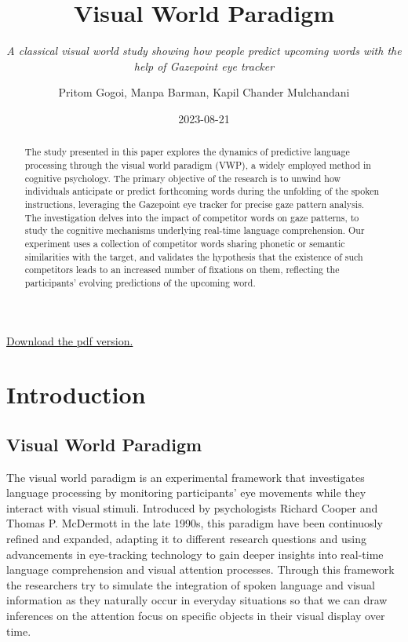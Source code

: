 \documentclass[
  a4paper,
]{article}
\title{\textbf{Visual World Paradigm}}
\subtitle{\emph{A classical visual world study showing how people
predict upcoming words with the help of Gazepoint eye tracker}}
\author{Pritom Gogoi, Manpa Barman, Kapil Chander Mulchandani}
\date{2023-08-21}
\renewcommand*\contentsname{Table of contents}
\newcommand\contentsname{Table of contents}
\begin{document}
\maketitle
\begin{abstract}
The study presented in this paper explores the dynamics of predictive
language processing through the visual world paradigm (VWP), a widely
employed method in cognitive psychology. The primary objective of the
research is to unwind how individuals anticipate or predict forthcoming
words during the unfolding of the spoken instructions, leveraging the
Gazepoint eye tracker for precise gaze pattern analysis. The
investigation delves into the impact of competitor words on gaze
patterns, to study the cognitive mechanisms underlying real-time
language comprehension. Our experiment uses a collection of competitor
words sharing phonetic or semantic similarities with the target, and
validates the hypothesis that the existence of such competitors leads to
an increased number of fixations on them, reflecting the participants'
evolving predictions of the upcoming word.
\end{abstract}
\ifdefined\Shaded\renewenvironment{Shaded}{\begin{tcolorbox}[borderline west={3pt}{0pt}{shadecolor}, enhanced, breakable, boxrule=0pt, interior hidden, frame hidden, sharp corners]}{\end{tcolorbox}}\fi

\renewcommand*\contentsname{Table of contents}
{
\hypersetup{linkcolor=}
\setcounter{tocdepth}{3}
\tableofcontents
}
\href{report/docs/report.pdf}{Download the pdf version.}

\hypertarget{introduction}{%
\section{Introduction}\label{introduction}}

\hypertarget{visual-world-paradigm}{%
\subsection{Visual World Paradigm}\label{visual-world-paradigm}}

The visual world paradigm is an experimental framework that investigates
language processing by monitoring participants' eye movements while they
interact with visual stimuli. Introduced by psychologists Richard Cooper
and Thomas P. McDermott in the late 1990s, this paradigm have been
continuosly refined and expanded, adapting it to different research
questions and using advancements in eye-tracking technology to gain
deeper insights into real-time language comprehension and visual
attention processes. Through this framework the researchers try to
simulate the integration of spoken language and visual information as
they naturally occur in everyday situations so that we can draw
inferences on the attention focus on specific objects in their visual
display over time.
\end{document}
